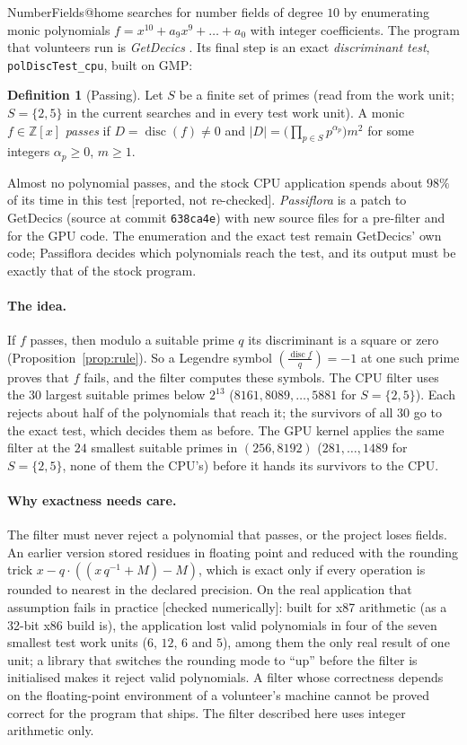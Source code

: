 \documentclass[10pt,a4paper]{article}
\newcommand{\Z}{\mathbb{Z}}
\DeclareMathOperator{\disc}{disc}
\newcommand{\leg}[2]{\left(\frac{#1}{#2}\right)}
\newcommand{\code}[1]{\texttt{#1}}
\newcommand{\stnum}{\textsf{\small[checked numerically]}\xspace}
\newcommand{\streport}{\textsf{\small[reported, not re-checked]}\xspace}
\theoremstyle{plain}
\theoremstyle{definition}
\newtheorem{definition}[proposition]{Definition}
\begin{document}
NumberFields@home searches for number fields of degree $10$ by enumerating monic polynomials $f=x^{10}+a_9x^9+\dots+a_0$ with integer coefficients.  The
program that volunteers run is \emph{GetDecics} \cite{gd}.  Its final step is an exact \emph{discriminant test}, \code{polDiscTest\_cpu}, built on GMP:

\begin{definition}[Passing]\label{def:pass}
Let $S$ be a finite set of primes (read from the work unit; $S=\{2,5\}$ in the current searches and in every test work unit).  A monic $f\in\Z[x]$ \emph{passes} if
$D=\disc(f)\neq0$ and $|D|=\bigl(\prod_{p\in S}p^{\alpha_p}\bigr)m^2$ for some integers $\alpha_p\ge0$, $m\ge1$.
\end{definition}

Almost no polynomial passes, and the stock CPU application spends about $98\%$ of its time in this test \streport.  \emph{Passiflora} is a patch to GetDecics
(source at commit \code{638ca4e}) with new source files for a pre-filter and for the GPU code.  The enumeration and the exact test remain GetDecics' own code;
Passiflora decides which polynomials reach the test, and its output must be exactly that of the stock program.

\paragraph{The idea.}  If $f$ passes, then modulo a suitable prime $q$ its discriminant is a square or zero (Proposition~\ref{prop:rule}).  So a Legendre
symbol $\leg{\disc f}{q}=-1$ at one such prime proves that $f$ fails, and the filter computes these symbols.  The CPU filter uses the $30$ largest suitable
primes below $2^{13}$ ($8161,8089,\dots,5881$ for $S=\{2,5\}$).  Each rejects about half of the polynomials that reach it; the survivors of all $30$ go to the
exact test, which decides them as before.  The GPU kernel applies the same filter at the
$24$ smallest suitable primes in $(256,8192)$ ($281,\dots,1489$ for $S=\{2,5\}$, none of them the CPU's) before it hands its survivors to the CPU.

\paragraph{Why exactness needs care.}  The filter must never reject a polynomial that passes, or the project loses fields.  An earlier version stored
residues in floating point and reduced with the rounding trick $x-q\cdot((x\,q^{-1}+M)-M)$, which is exact only if every operation is rounded to nearest in
the declared precision.  On the real application that assumption fails in practice \stnum: built for x87 arithmetic (as a 32-bit x86 build is), the application
lost valid polynomials in four of the seven smallest test work units ($6$, $12$, $6$ and $5$), among them the only real result of one unit; a library that switches
the rounding mode to ``up'' before the filter is initialised makes it reject valid polynomials.  A filter whose correctness depends on the floating-point
environment of a volunteer's machine cannot be proved correct for the program that ships.  The filter described here uses integer arithmetic only.
\end{document}
